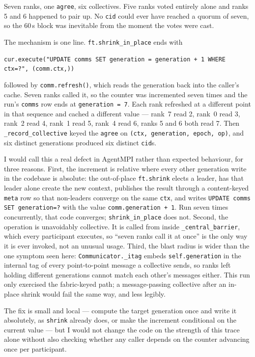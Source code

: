 \documentclass[11pt]{article}
\begin{document}
Seven ranks, one \texttt{agree}, six collectives. Five ranks voted entirely alone and
ranks 5 and 6 happened to pair up. No \texttt{cid} could ever have reached a quorum of
seven, so the 60\,s block was inevitable from the moment the votes were cast.

The mechanism is one line. \texttt{ft.shrink\_in\_place} ends with

\begin{center}\texttt{cur.execute("UPDATE comms SET generation = generation + 1 WHERE ctx=?", (comm.ctx,))}\end{center}

\noindent followed by \texttt{comm.refresh()}, which reads the generation back into the
caller's cache. Seven ranks called it, so the counter was incremented seven times and the
run's \texttt{comms} row ends at \texttt{generation = 7}. Each rank refreshed at a
different point in that sequence and cached a different value --- rank~7 read 2, rank~0
read 3, rank~2 read 4, rank~1 read 5, rank~4 read 6, ranks 5 and 6 both read 7. Then
\texttt{\_record\_collective} keyed the \texttt{agree} on
\texttt{(ctx, generation, epoch, op)}, and six distinct generations produced six distinct
\texttt{cid}s.

I would call this a real defect in AgentMPI rather than expected behaviour, for three
reasons. First, the increment is relative where every other generation write in the
codebase is absolute: the out-of-place \texttt{ft.shrink} elects a leader, has that leader
alone create the new context, publishes the result through a content-keyed \texttt{meta}
row so that non-leaders converge on the same \texttt{ctx}, and writes
\texttt{UPDATE comms SET generation=?} with the value \texttt{comm.generation + 1}. Run
seven times concurrently, that code converges; \texttt{shrink\_in\_place} does not.
Second, the operation is unavoidably collective. It is called from inside
\texttt{\_central\_barrier}, which every participant executes, so ``seven ranks call it at
once'' is the only way it is ever invoked, not an unusual usage. Third, the blast radius
is wider than the one symptom seen here: \texttt{Communicator.\_itag} embeds
\texttt{self.generation} in the internal tag of every point-to-point message a collective
sends, so ranks left holding different generations cannot match each other's messages
either. This run only exercised the fabric-keyed path; a message-passing collective after
an in-place shrink would fail the same way, and less legibly.

The fix is small and local --- compute the target generation once and write it absolutely,
as \texttt{shrink} already does, or make the increment conditional on the current value ---
but I would not change the code on the strength of this trace alone without also checking
whether any caller depends on the counter advancing once per participant.
\end{document}
